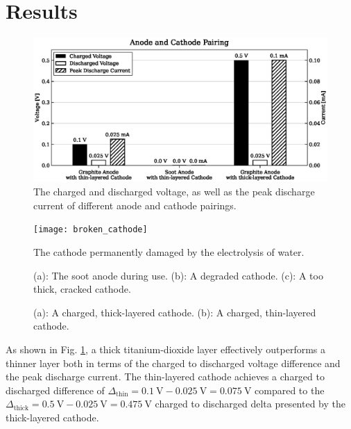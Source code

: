 \section{Results}
\begin{figure}[ht!]
\centering
\includegraphics[width=\textwidth]{images/batteryfig.eps}
\caption{The charged and discharged voltage, as well as the peak discharge current of different anode and cathode pairings.}
\label{fig:anodecathodepairing}
\end{figure}

\begin{figure}[ht!]
\centering
\texttt{[image: broken\_cathode]}
\caption{The cathode permanently damaged by the electrolysis of water.}
\label{fig:brokencathode}
\end{figure}

\begin{figure}[ht!]
\centering
{}
\caption{(a): The soot anode during use. (b): A degraded cathode. (c): A too thick, cracked cathode.}
\label{fig:degradedelectrodes}
\end{figure}

\begin{figure}[ht!]
\centering
{}
\caption{(a): A charged, thick-layered cathode. (b): A charged, thin-layered cathode.}
\label{fig:chargedchathodes}
\end{figure}

\newpage
    
As shown in Fig. \ref{fig:anodecathodepairing}, a thick titanium-dioxide layer effectively outperforms a thinner layer both in terms of the charged to discharged voltage difference and the peak discharge current.
The thin-layered cathode achieves a charged to discharged difference of $\Delta_{\text{thin}} = \SI{0.1}{\V} - \SI{0.025}{\V} = \SI{0.075}{\V}$ compared to the $\Delta_{\text{thick}} = \SI{0.5}{\V} - \SI{0.025}{\V} = \SI{0.475}{\V}$ charged to discharged delta presented by the thick-layered cathode.

